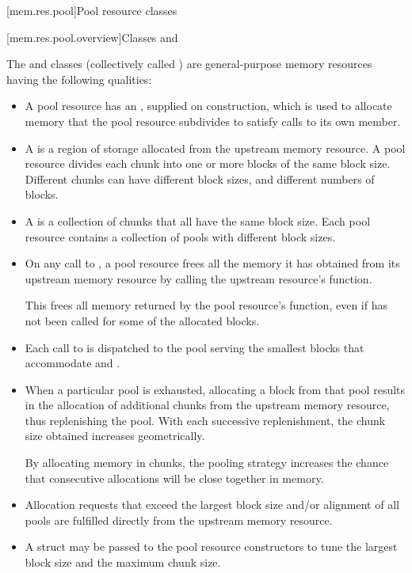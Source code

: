 [mem.res.pool]{Pool resource classes}

[mem.res.pool.overview]{Classes  and }

\pnum
The  and
 classes
(collectively called )
are general-purpose memory resources having the following qualities:
\begin{itemize}
\item
A pool resource has an ,
supplied on construction, which is used to allocate memory that
the pool resource subdivides to satisfy calls to its own
 member.

\item
A  is a region of storage allocated
from the upstream memory resource. A pool resource divides
each chunk into one or more blocks of the same block size.
Different chunks can have different block sizes, and different
numbers of blocks.

\item
A  is a collection of chunks that all have the same
block size. Each pool resource contains a collection of pools
with different block sizes.

\item
On any call to , a pool resource frees all the memory
it has obtained from its upstream memory resource by calling
the upstream resource's  function.
\begin{note}
This frees all memory returned by the pool resource's 
function, even if  has not been called for some
of the allocated blocks.
\end{note}

\item
Each call to  is dispatched
to the pool serving the smallest blocks that accommodate
 and .

\item
When a particular pool is exhausted,
allocating a block from that pool results in the allocation
of additional chunks from the upstream memory resource,
thus replenishing the pool.
With each successive replenishment,
the chunk size obtained increases geometrically.
\begin{note}
By allocating memory in chunks,
the pooling strategy increases the chance that consecutive allocations
will be close together in memory.
\end{note}

\item
Allocation requests that exceed the largest block size and/or alignment
of all pools are fulfilled directly from the upstream memory resource.

\item
A  struct may be passed to the pool resource constructors
to tune the largest block size and the maximum chunk size.
\end{itemize}

